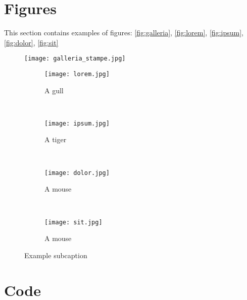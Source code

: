 \section{Figures}

This section contains examples of figures: \autoref{fig:galleria}, \autoref{fig:lorem}, \autoref{fig:ipsum}, \autoref{fig:dolor}, \autoref{fig:sit}

\begin{figure}[H] 
	\centering 
	\texttt{[image: galleria\_stampe.jpg]} 
	\label{fig:galleria} 
\end{figure}

\begin{figure}[H]
	\centering
	\begin{subfigure}[b]{0.45\textwidth}
		\texttt{[image: lorem.jpg]}
		\caption{A gull}
		\label{fig:lorem}
	\end{subfigure}
	~ %
	\begin{subfigure}[b]{0.45\textwidth}
		\texttt{[image: ipsum.jpg]}
		\caption{A tiger}
		\label{fig:ipsum}
	\end{subfigure}
	~ %
	\begin{subfigure}[b]{0.45\textwidth}
		\texttt{[image: dolor.jpg]}
		\caption{A mouse}
		\label{fig:dolor}
	\end{subfigure}
	~ %
	\begin{subfigure}[b]{0.45\textwidth}
		\texttt{[image: sit.jpg]}
		\caption{A mouse}
		\label{fig:sit}
	\end{subfigure}
	\caption{Example subcaption}\label{fig:animals}
\end{figure}


\section{Code}

